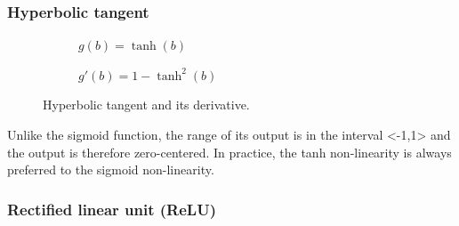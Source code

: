 \subsubsection{Hyperbolic tangent}

\vspace{5mm}
\begin{figure}[h]  
	\centering 
	\begin{subfigure}[b]{0.4\linewidth}
		\caption{$ g(b)=\tanh(b) $}   
	\end{subfigure}
	\begin{subfigure}[b]{0.4\linewidth}
		\caption{$ g'(b)=1-\tanh^2(b) $}  
	\end{subfigure}
	\vspace{10mm}
	\caption{Hyperbolic tangent and its derivative.}
\end{figure}

Unlike the sigmoid function, the range of its output is in the interval <-1,1> and the output is therefore zero-centered. In practice, the tanh non-linearity is always preferred to the sigmoid non-linearity. \cite{stanford-github}

\subsubsection{Rectified linear unit (ReLU)}
\vspace{5mm}

